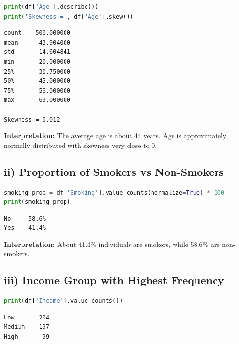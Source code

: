 \documentclass[12pt, a4paper]{article}
\begin{document}
\begin{lstlisting}[language=Python]
print(df['Age'].describe())
print('Skewness =', df['Age'].skew())
\end{lstlisting}

\begin{outputbox}
\begin{verbatim}
count    500.000000
mean      43.904000
std       14.604841
min       20.000000
25%       30.750000
50%       45.000000
75%       56.000000
max       69.000000

Skewness = 0.012
\end{verbatim}
\end{outputbox}

\textbf{\textcolor{RoyalNavy}{Interpretation:}} The average age is about 44 years. Age is approximately normally distributed with skewness very close to 0.

\subsection*{ii) Proportion of Smokers vs Non-Smokers}

\begin{lstlisting}[language=Python]
smoking_prop = df['Smoking'].value_counts(normalize=True) * 100
print(smoking_prop)
\end{lstlisting}

\begin{outputbox}
\begin{verbatim}
No     58.6%
Yes    41.4%
\end{verbatim}
\end{outputbox}

\textbf{\textcolor{RoyalNavy}{Interpretation:}} About 41.4\% individuals are smokers, while 58.6\% are non-smokers.

\subsection*{iii) Income Group with Highest Frequency}

\begin{lstlisting}[language=Python]
print(df['Income'].value_counts())
\end{lstlisting}

\begin{outputbox}
\begin{verbatim}
Low       204
Medium    197
High       99
\end{verbatim}
\end{outputbox}
\end{document}
